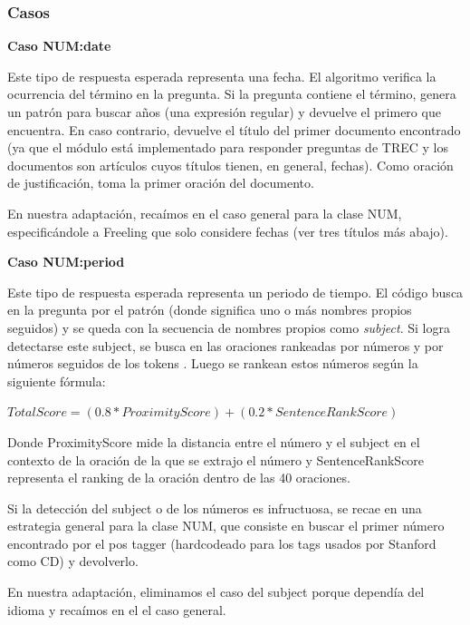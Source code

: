 \begin{frame}
\frametitle{Casos}

\textbf{Caso NUM:date} \newline

Este tipo de respuesta esperada representa una fecha. El algoritmo verifica la ocurrencia del término  en la pregunta. Si la pregunta contiene el término, genera un patrón para buscar años (una expresión regular) y devuelve el primero que encuentra. En caso contrario, devuelve el título del primer documento encontrado (ya que el módulo está implementado para responder preguntas de TREC y los documentos son artículos cuyos títulos tienen, en general, fechas). Como oración de justificación, toma la primer oración del documento.

En nuestra adaptación, recaímos en el caso general para la clase NUM, especificándole a Freeling que solo considere fechas (ver tres títulos más abajo).\newline

\textbf{Caso NUM:period} \newline

Este tipo de respuesta esperada representa un periodo de tiempo. El código busca en la pregunta por el patrón  (donde  significa uno o más nombres propios seguidos) y se queda con la secuencia de nombres propios como \textit{subject}.
Si logra detectarse este subject, se busca en las oraciones rankeadas por números y por números seguidos de los tokens . Luego se rankean estos números según la siguiente fórmula:\newline

$TotalScore = (0.8 * ProximityScore) + (0.2 * SentenceRankScore)$ \newline

Donde ProximityScore mide la distancia entre el número y el subject en el contexto de la oración de la que se extrajo el número y SentenceRankScore representa el ranking de la oración dentro de las 40 oraciones.

Si la detección del subject o de los números es infructuosa, se recae en una estrategia general para la clase NUM, que consiste en buscar el primer número encontrado por el pos tagger (hardcodeado para los tags usados por Stanford como CD) y devolverlo.

En nuestra adaptación, eliminamos el caso del subject porque dependía del idioma y recaímos en el el caso general. \newline
\end{frame}

